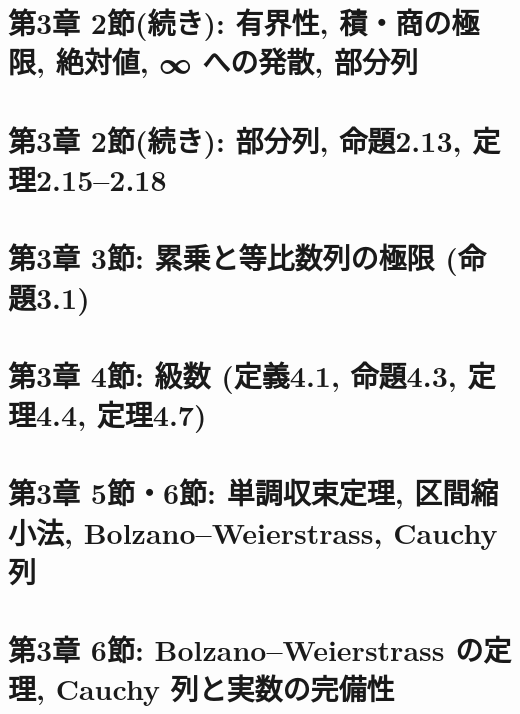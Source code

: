 \section{第3章 2節(続き): 有界性, 積・商の極限, 絶対値, ∞ への発散, 部分列}







\section{第3章 2節(続き): 部分列, 命題2.13, 定理2.15–2.18}

















\section{第3章 3節: 累乗と等比数列の極限 (命題3.1)}












\section{第3章 4節: 級数 (定義4.1, 命題4.3, 定理4.4, 定理4.7)}












\section{第3章 5節・6節: 単調収束定理, 区間縮小法, Bolzano–Weierstrass, Cauchy 列}











\section{第3章 6節: Bolzano–Weierstrass の定理, Cauchy 列と実数の完備性}







